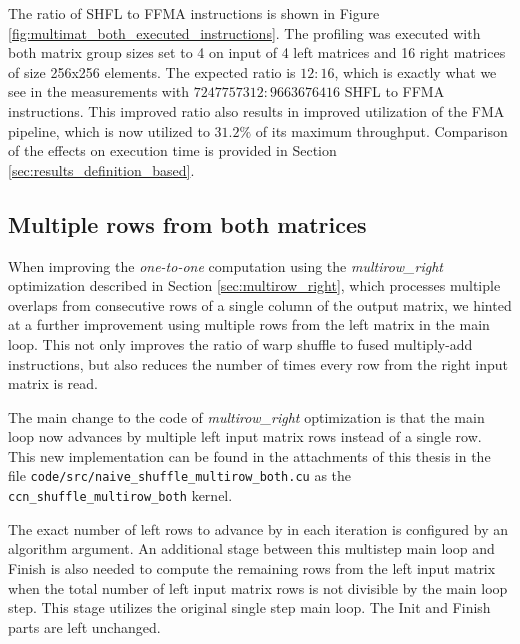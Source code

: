 The ratio of SHFL to FFMA instructions is shown in Figure \ref{fig:multimat_both_executed_instructions}. The profiling was executed with both matrix group sizes set to 4 on input of 4 left matrices and 16 right matrices of size 256x256 elements. The expected ratio is $12 : 16$, which is exactly what we see in the measurements with $7 247 757 312 : 9 663 676 416$ SHFL to FFMA instructions. This improved ratio also results in improved utilization of the FMA pipeline, which is now utilized to
$31.2\%$ of its maximum throughput. Comparison of the effects on execution time is provided in Section \ref{sec:results_definition_based}.

\subsection{Multiple rows from both matrices}
\label{sec:multirow_both}

When improving the \textit{one-to-one} computation using the \textit{multirow\_right} optimization described in Section \ref{sec:multirow_right}, which processes multiple overlaps from consecutive rows of a single column of the output matrix, we hinted at a further improvement using multiple rows from the left matrix in the main loop. This not only improves the ratio of warp shuffle to fused multiply-add instructions, but also reduces the number of times every row from the right input matrix is read. 

The main change to the code of \textit{multirow\_right} optimization is that the main loop now advances by multiple left input matrix rows instead of a single row. This new implementation can be found in the attachments of this thesis in the file \texttt{code/src/naive\_shuffle\_multirow\_both.cu} as the \texttt{ccn\_shuffle\_multirow\_both} kernel.

The exact number of left rows to advance by in each iteration is configured by an algorithm argument. An additional stage between this multistep main loop and Finish is also needed to compute the remaining rows from the left input matrix when the total number of left input matrix rows is not divisible by the main loop step. This stage utilizes the original single step main loop. The Init and Finish parts are left unchanged.


